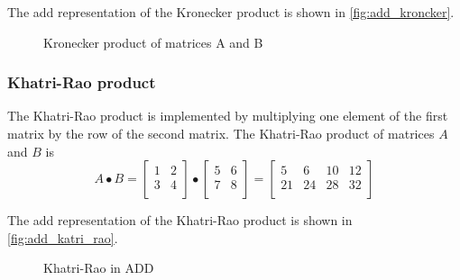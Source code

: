 The \gls{add} representation of the Kronecker product is shown in \autoref{fig:add_kroncker}.
\begin{figure*}
    \centering
           
    \caption{Kronecker product of matrices A and B}
    \label{fig:add_kroncker}
\end{figure*}

\subsubsection{Khatri-Rao product}
The Khatri-Rao product is implemented by multiplying one element of the first matrix by the row of the second matrix.
The Khatri-Rao product of matrices $A$ and $B$ is
\[
A \bullet B = \begin{bmatrix}
    1 & 2 \\
    3 & 4 \\
\end{bmatrix} \bullet \begin{bmatrix}
    5 & 6 \\
    7 & 8 \\
\end{bmatrix} = \begin{bmatrix}
    5 & 6 & 10 & 12 \\
    21 & 24 & 28 & 32 \\
\end{bmatrix}
\]

The \gls{add} representation of the Khatri-Rao product is shown in \autoref{fig:add_katri_rao}.
\begin{figure*}
    \centering
            
    \caption{Khatri-Rao in ADD}
    \label{fig:add_katri_rao}
\end{figure*}


